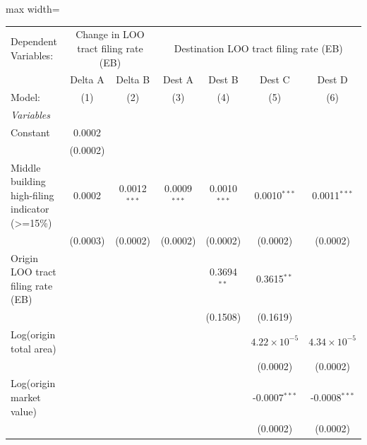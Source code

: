 \documentclass[
  11pt,
]{article}
\begin{document}
\begin{adjustbox}{max width=\textwidth}
\begingroup
\centering
\begin{tabular}{lcccccc}
   \tabularnewline \midrule \midrule
   Dependent Variables: & \multicolumn{2}{c}{Change in LOO tract filing rate (EB)} & \multicolumn{4}{c}{Destination LOO tract filing rate (EB)}\\
                                                   & Delta A  & Delta B        & Dest A         & Dest B         & Dest C                & Dest D \\   
   Model:                                          & (1)      & (2)            & (3)            & (4)            & (5)                   & (6)\\  
   \midrule
   \emph{Variables}\\
   Constant                                        & 0.0002   &                &                &                &                       &   \\   
                                                   & (0.0002) &                &                &                &                       &   \\   
   Middle building high-filing indicator (>=15\%)  & 0.0002   & 0.0012$^{***}$ & 0.0009$^{***}$ & 0.0010$^{***}$ & 0.0010$^{***}$        & 0.0011$^{***}$\\   
                                                   & (0.0003) & (0.0002)       & (0.0002)       & (0.0002)       & (0.0002)              & (0.0002)\\   
   Origin LOO tract filing rate (EB)               &          &                &                & 0.3694$^{**}$  & 0.3615$^{**}$         &   \\   
                                                   &          &                &                & (0.1508)       & (0.1619)              &   \\   
   Log(origin total area)                          &          &                &                &                & $4.22\times 10^{-5}$  & $4.34\times 10^{-5}$\\    
                                                   &          &                &                &                & (0.0002)              & (0.0002)\\   
   Log(origin market value)                        &          &                &                &                & -0.0007$^{***}$       & -0.0008$^{***}$\\   
                                                   &          &                &                &                & (0.0002)              & (0.0002)\\   

\end{tabular}
\end{adjustbox}
\end{document}

